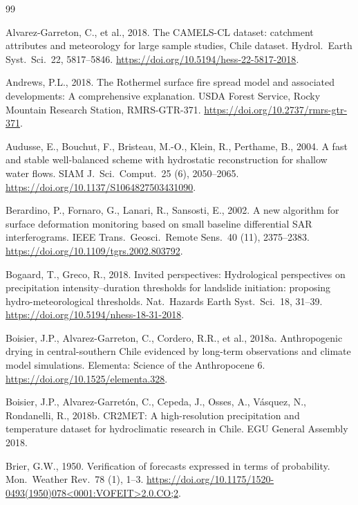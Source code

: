 \documentclass[authoryear,preprint,review,12pt]{elsarticle}
\begin{document}
\begin{thebibliography}{99}

Alvarez-Garreton, C., et al., 2018. The CAMELS-CL dataset: catchment attributes
and meteorology for large sample studies, Chile dataset. Hydrol.\ Earth Syst.\
Sci.\ 22, 5817--5846. \url{https://doi.org/10.5194/hess-22-5817-2018}.

Andrews, P.L., 2018. The Rothermel surface fire spread model and associated
developments: A comprehensive explanation. USDA Forest Service, Rocky Mountain
Research Station, RMRS-GTR-371. \url{https://doi.org/10.2737/rmrs-gtr-371}.

Audusse, E., Bouchut, F., Bristeau, M.-O., Klein, R., Perthame, B., 2004. A fast
and stable well-balanced scheme with hydrostatic reconstruction for shallow water
flows. SIAM J.\ Sci.\ Comput.\ 25 (6), 2050--2065.
\url{https://doi.org/10.1137/S1064827503431090}.

Berardino, P., Fornaro, G., Lanari, R., Sansosti, E., 2002. A new algorithm for
surface deformation monitoring based on small baseline differential SAR
interferograms. IEEE Trans.\ Geosci.\ Remote Sens.\ 40 (11), 2375--2383.
\url{https://doi.org/10.1109/tgrs.2002.803792}.

Bogaard, T., Greco, R., 2018. Invited perspectives: Hydrological perspectives on
precipitation intensity--duration thresholds for landslide initiation: proposing
hydro-meteorological thresholds. Nat.\ Hazards Earth Syst.\ Sci.\ 18, 31--39.
\url{https://doi.org/10.5194/nhess-18-31-2018}.

Boisier, J.P., Alvarez-Garreton, C., Cordero, R.R., et al., 2018a. Anthropogenic
drying in central-southern Chile evidenced by long-term observations and climate
model simulations. Elementa: Science of the Anthropocene 6.
\url{https://doi.org/10.1525/elementa.328}.

Boisier, J.P., Alvarez-Garret\'on, C., Cepeda, J., Osses, A., V\'asquez, N.,
Rondanelli, R., 2018b. CR2MET: A high-resolution precipitation and temperature
dataset for hydroclimatic research in Chile. EGU General Assembly 2018.

Brier, G.W., 1950. Verification of forecasts expressed in terms of probability.
Mon.\ Weather Rev.\ 78 (1), 1--3.
\url{https://doi.org/10.1175/1520-0493(1950)078<0001:VOFEIT>2.0.CO;2}.


\end{thebibliography}
\end{document}
